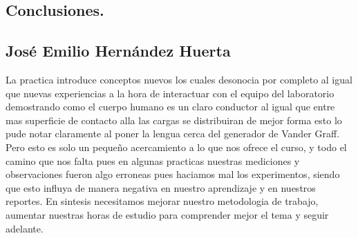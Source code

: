 \documentclass[10pt]{article}
\begin{document}
\begin{multicols}{2}
\section{Conclusiones.}
\subsection{José Emilio Hernández Huerta}
La practica introduce conceptos nuevos los cuales desonocia por completo al igual que nuevas experiencias a la hora de interactuar con el equipo del laboratorio demostrando como el cuerpo humano es un claro conductor al igual que entre mas superficie de contacto alla las cargas se distribuiran de mejor forma esto lo pude notar claramente al poner la lengua cerca del generador de Vander Graff. Pero esto es solo un pequeño acercamiento a lo que nos ofrece el curso, y todo el camino que nos falta pues en algunas practicas nuestras mediciones y observaciones fueron algo erroneas pues haciamos mal los experimentos, siendo que esto influya de manera negativa en nuestro aprendizaje y en nuestros reportes. En sintesis necesitamos mejorar nuestro metodologia de trabajo, aumentar nuestras horas de estudio para comprender mejor el tema y seguir adelante.

\end{multicols}
\newpage
\clearpage
\begin{thebibliography}{0}
\end{thebibliography}
\end{document}
